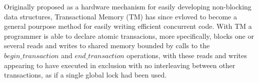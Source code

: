 \documentclass[11pt,letterpaper]{article}
\begin{document}
\newlength {\squarewidth}
\renewenvironment {square}
{
\setlength {\squarewidth} {\linewidth}
\addtolength {\squarewidth} {-12pt}
\renewcommand{\baselinestretch}{0.75} \footnotesize
\begin {center}
\begin {tabular} {|c|} \hline
\begin {minipage} {\squarewidth}
\medskip
}{
\end {minipage}
\\ \hline
\end{tabular}
\end{center}
}  
 
\newtheorem{definition}{Definition}
\newtheorem{theorem}{Theorem}
\newtheorem{lemma}{Lemma}
\newtheorem{corollary}{Corollary}
\newcommand{\toto}{xxx}
\newenvironment{proofT}{\noindent{\bf
Proof }} {\hspace*{\fill}$\Box_{Theorem~\ref{\toto}}$\par\vspace{3mm}}
\newenvironment{proofL}{\noindent{\bf
Proof }} {\hspace*{\fill}$\Box_{Lemma~\ref{\toto}}$\par\vspace{3mm}}
\newenvironment{proofC}{\noindent{\bf
Proof }} {\hspace*{\fill}$\Box_{Corollary~\ref{\toto}}$\par\vspace{3mm}}


\newcommand{\linenumbering}{\ifthenelse{\value{linecounter}<10}
{(0\arabic{linecounter})}{(\arabic{linecounter})}}
\renewcommand{\line}[1]{\refstepcounter{linecounter}\label{#1}\linenumbering}
\newcommand{\resetline}[1]{\setcounter{linecounter}{0}#1}
\renewcommand{\thelinecounter}{\ifnum \value{linecounter} > 
9\else 0\fi \arabic{linecounter}}

\newcommand{\tuple}[1]{\ensuremath{\left \langle #1 \right \rangle }}


Originally proposed as a hardware mechanism for easily developing non-blocking data structures,
Transactional Memory (TM) has since evloved to become a general pourpose method for easily writing
efficient concurrent code.
With TM a programmer is able to declare atomic transacions, more specifically, blocks
one or several reads and writes to shared memory bounded by calls to the
$\mathit{begin\_transaction}$ and $\mathit{end\_transaction}$ operations, with
these reads and writes appearing to have executed in exclusion with no interleaving
between other transactions, as if a single global lock had been used.
\end{document}
